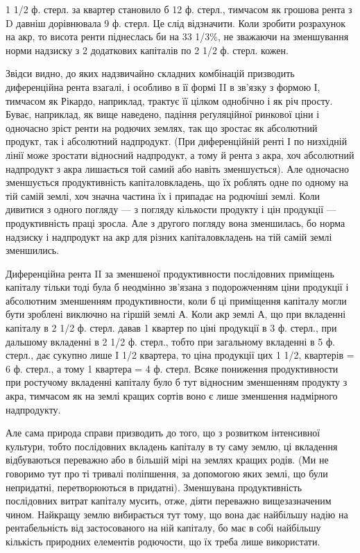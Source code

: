 1 1/2 ф. стерл. за квартер становило б 12 ф. стерл., тимчасом як грошова рента
з D давніш дорівнювала 9 ф. стерл. Це слід відзначити. Коли зробити розрахунок
на акр, то висота ренти піднеслась би на 33 1/3\%, не зважаючи на зменшування
норми надзиску з 2 додаткових капіталів по 2 1/2 ф. стерл. кожен.

Звідси видно, до яких надзвичайно складних комбінацій призводить диференційна
рента взагалі, і особливо в її формі II в зв’язку з формою І, тимчасом
як Рікардо, наприклад, трактує її цілком однобічно і як річ просту. Буває, наприклад,
як вище наведено, падіння реґуляційної ринкової ціни і одночасно зріст
ренти на родючих землях, так що зростає як абсолютний продукт, так і
абсолютний надпродукт. (При диференційній ренті І по низхідній лінії може
зростати відносний надпродукт, а тому й рента з акра, хоч абсолютний надпродукт
з акра лишається той самий або навіть зменшується). Але одночасно
зменшується продуктивність капіталовкладень, що їх роблять одне по одному
на тій самій землі, хоч значна частина їх і припадає на родючіші землі. Коли
дивитися з одного погляду — з погляду кількости продукту і цін продукції —
продуктивність праці зросла. Але з другого погляду вона зменшилась, бо норма
надзиску і надпродукт на акр для різних капіталовкладень на тій самій землі
зменшились.

Диференційна рента II за зменшеної продуктивности послідовних приміщень
капіталу тільки тоді була б неодмінно зв’язана з подорожченням ціни продукції
і абсолютним зменшенням продуктивности, коли б ці приміщення капіталу
могли бути зроблені виключно на гіршій землі А. Коли акр землі А, що
при вкладенні капіталу в 2 1/2 ф. стерл. давав 1 квартер по ціні продукції
в 3 ф. стерл., при дальшому вкладенні в 2 1/2 ф. стерл., тобто при загальному
вкладенні в 5 ф. стерл., дає сукупно лише I 1/2 квартера, то ціна продукції цих
1 1/2, квартерів = 6 ф. стерл., а тому 1 квартера = 4 ф. стерл. Всяке пониження
продуктивности при ростучому вкладенні капіталу було б тут відносним зменшенням
продукту з акра, тимчасом як на землі кращих сортів воно є лише
зменшення надмірного надпродукту.

Але сама природа справи призводить до того, що з розвитком інтенсивної
культури, тобто послідовних вкладень капіталу в ту саму землю, ці вкладення
відбуваються переважно або в більшій мірі на землях кращих родів. (Ми не говоримо
тут про ті тривалі поліпшення, за допомогою яких землі, що були непридатні,
перетворюються в придатні). Зменшувана продуктивність послідовних
витрат капіталу мусить, отже, діяти переважно вищезазначеним чином. Найкращу
землю вибирається тут тому, що вона дає найбільшу надію на рентабельність
від застосованого на ній капіталу, бо має в собі найбільшу кількість природних
елементів родючости, що їх треба лише використати.

